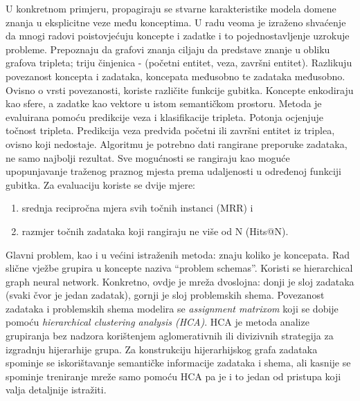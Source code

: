U konkretnom primjeru, propagiraju se stvarne karakteristike modela domene znanja u eksplicitne veze među konceptima.\newline
\newline
U radu \citep{trans} veoma je izraženo shvaćenje da mnogi radovi poistovjećuju koncepte i zadatke i to pojednostavljenje uzrokuje probleme.\newline
Prepoznaju da grafovi znanja ciljaju da predstave znanje u obliku grafova tripleta; triju činjenica - (početni entitet, veza, završni entitet).\newline
Razlikuju povezanost koncepta i zadataka, koncepata međusobno te zadataka međusobno. Ovisno o vrsti povezanosti, koriste različite funkcije gubitka.\newline
Koncepte enkodiraju kao sfere, a zadatke kao vektore u istom semantičkom prostoru.\newline
Metoda je evaluirana pomoću predikcije veza i klasifikacije tripleta. Potonja ocjenjuje točnost tripleta.
Predikcija veza predviđa početni ili završni entitet iz triplea, ovisno koji nedostaje. Algoritmu je potrebno dati rangirane preporuke zadataka, ne samo najbolji rezultat.
Sve mogućnosti se rangiraju kao moguće upopunjavanje traženog praznog mjesta prema udaljenosti u određenoj funkciji gubitka. Za evaluaciju koriste se dvije mjere:
\begin{enumerate}
\item srednja recipročna mjera svih točnih instanci (MRR) i
\item razmjer točnih zadataka koji rangiraju ne više od N (Hits@N).
\end{enumerate}
Glavni problem, kao i u većini istraženih metoda: znaju koliko je koncepata.\newline
\newline
Rad \citep{hgkt} slične vježbe grupira u koncepte naziva “problem schemas”. Koristi se hierarchical graph neural network. Konkretno, ovdje je mreža dvoslojna: donji je sloj zadataka (svaki čvor je jedan zadatak), gornji je sloj problemskih shema. Povezanost zadataka i problemskih shema modelira se \textit{assignment matrixom} koji se dobije pomoću \textit{hierarchical clustering analysis (HCA)}. HCA je metoda analize grupiranja bez nadzora korištenjem aglomerativnih ili divizivnih strategija za izgradnju hijerarhije grupa.
Za konstrukciju hijerarhijskog grafa zadataka spominje se iskorištavanje semantičke informacije zadataka i shema, ali kasnije se  spominje treniranje mreže samo pomoću HCA pa je i to jedan od pristupa koji valja detaljnije istražiti.\newline
